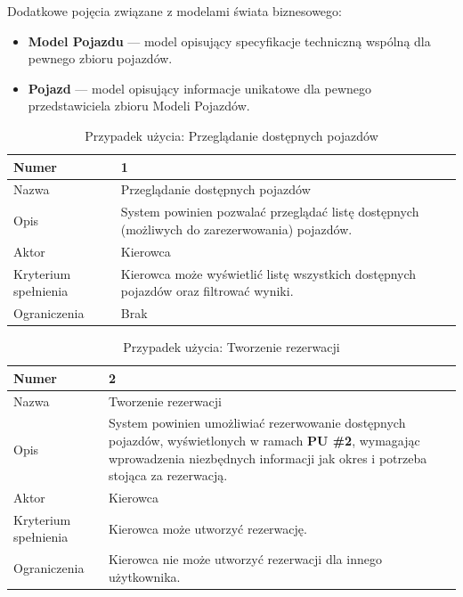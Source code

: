 \documentclass[eng,printmode,openany]{mgr}
\begin{document}
	Dodatkowe pojęcia związane z modelami świata biznesowego:
	\begin{itemize}
		\item \textbf{Model Pojazdu} — model opisujący specyfikacje techniczną wspólną dla pewnego zbioru pojazdów.
		\item \textbf{Pojazd} — model opisujący informacje unikatowe dla pewnego przedstawiciela zbioru Modeli Pojazdów.
	\end{itemize}
	
	\begin{table}[H]
		\caption{Przypadek użycia: Przeglądanie dostępnych pojazdów}
		\begin{tabularx}{\textwidth}{|l|X|}
			\hline
			Numer                & 1  \\ \hline
			Nazwa                & Przeglądanie dostępnych pojazdów \\ \hline
			Opis                 & System powinien pozwalać przeglądać listę dostępnych (możliwych do zarezerwowania) pojazdów. \\ \hline
			Aktor                & Kierowca \\ \hline
			Kryterium spełnienia & Kierowca może wyświetlić listę wszystkich dostępnych pojazdów oraz filtrować wyniki. \\ \hline
			Ograniczenia         & Brak \\ \hline
		\end{tabularx}
	\end{table}
	
	\begin{table}[H]
		\caption{Przypadek użycia: Tworzenie rezerwacji}
		\begin{tabularx}{\textwidth}{|l|X|}
			\hline
			Numer                & 2 \\ \hline
			Nazwa                & Tworzenie rezerwacji \\ \hline
			Opis                 & System powinien umożliwiać rezerwowanie dostępnych pojazdów, wyświetlonych w ramach \textbf{PU \#2}, wymagając wprowadzenia niezbędnych informacji jak okres i potrzeba stojąca za rezerwacją. \\ \hline
			Aktor                & Kierowca \\ \hline
			Kryterium spełnienia & Kierowca może utworzyć rezerwację. \\ \hline
			Ograniczenia         & Kierowca nie może utworzyć rezerwacji dla innego użytkownika. \\ \hline
		\end{tabularx}
	\end{table}
	
\end{document}
